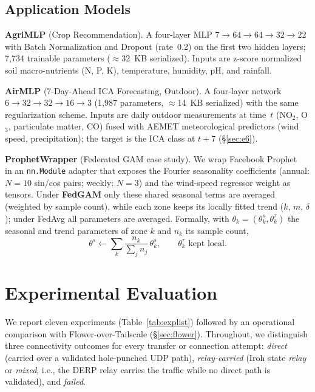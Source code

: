 \documentclass[a4paper,fleqn]{cas-dc}
\begin{document}
\subsection{Application Models}

\textbf{AgriMLP} (Crop Recommendation). A four-layer MLP $7 \to 64 \to 64 \to 32 \to 22$ with Batch Normalization and Dropout (rate~0.2) on the first two hidden layers; 7{,}734 trainable parameters ($\approx$32~KB serialized). Inputs are z-score normalized soil macro-nutrients (N, P, K), temperature, humidity, pH, and rainfall.

\textbf{AirMLP} (7-Day-Ahead ICA Forecasting, Outdoor). A four-layer network $6 \to 32 \to 32 \to 16 \to 3$ (1{,}987 parameters, $\approx$14~KB serialized) with the same regularization scheme. Inputs are daily outdoor measurements at time~$t$ (NO$_2$, O$_3$, particulate matter, CO) fused with AEMET meteorological predictors (wind speed, precipitation); the target is the ICA class at $t{+}7$ (\S\ref{sec:e6}).

\textbf{ProphetWrapper} (Federated GAM case study). We wrap Facebook Prophet~\cite{taylor2018prophet} in an \texttt{nn.Module} adapter that exposes the Fourier seasonality coefficients (annual: $N{=}10$ sin/cos pairs; weekly: $N{=}3$) and the wind-speed regressor weight as tensors. Under \textbf{FedGAM} only these shared seasonal terms are averaged (weighted by sample count), while each zone keeps its locally fitted trend ($k$, $m$, $\delta$); under FedAvg all parameters are averaged. Formally, with $\theta_k = (\theta_k^{s}, \theta_k^{\tau})$ the seasonal and trend parameters of zone $k$ and $n_k$ its sample count,
\begin{equation}
\theta^{s} \leftarrow \sum_k \frac{n_k}{\sum_j n_j}\,\theta_k^{s}, \qquad \theta_k^{\tau} \text{ kept local}.
\label{eq:fedgam}
\end{equation}

\section{Experimental Evaluation}
\label{sec:evaluation}

We report eleven experiments (Table~\ref{tab:explist}) followed by an operational comparison with Flower-over-Tailscale (\S\ref{sec:flower}). Throughout, we distinguish three connectivity outcomes for every transfer or connection attempt: \emph{direct} (carried over a validated hole-punched UDP path), \emph{relay-carried} (Iroh state \emph{relay} or \emph{mixed}, i.e., the DERP relay carries the traffic while no direct path is validated), and \emph{failed}.
\end{document}
